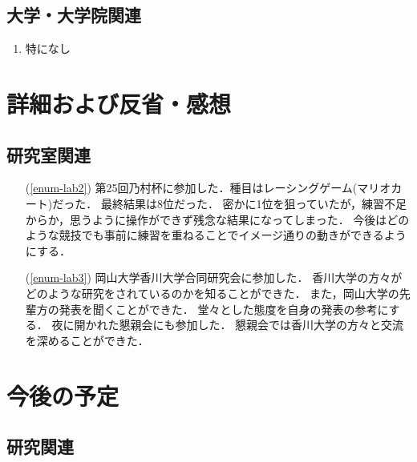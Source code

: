 \documentclass[fleqn, 14pt]{extarticle}
\begin{document}
\subsection{大学・大学院関連}
\label{sec-2-3}

\begin{enumerate}
\item 特になし
\hfill
\label{enum-univ2}
\end{enumerate}





\section{詳細および反省・感想}
\label{sec-3}
\subsection{研究室関連}
\label{sec-3-2}

\begin{itemize}
\item[(\ref{enum-lab2})]
第25回乃村杯に参加した．種目はレーシングゲーム(マリオカート)だった．
最終結果は8位だった．
密かに1位を狙っていたが，練習不足からか，思うように操作ができず残念な結果になってしまった．
今後はどのような競技でも事前に練習を重ねることでイメージ通りの動きができるようにする．

\item[(\ref{enum-lab3})]
岡山大学香川大学合同研究会に参加した．
香川大学の方々がどのような研究をされているのかを知ることができた．
また，岡山大学の先輩方の発表を聞くことができた．
堂々とした態度を自身の発表の参考にする．
夜に開かれた懇親会にも参加した．
懇親会では香川大学の方々と交流を深めることができた．
\end{itemize}

\section{今後の予定}
\label{sec-4}
\subsection{研究関連}
\label{sec-4-1}
\end{document}

